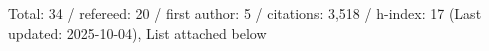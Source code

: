 Total: 34 / refereed: 20 / first author: 5 / citations: 3,518 / h-index: 17 (Last updated: 2025-10-04), List attached below